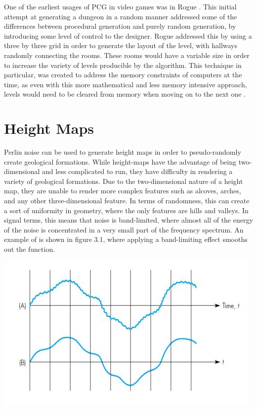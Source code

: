 \documentclass[10pt]{report}
\begin{document}
		One of the earliest usages of PCG in video games was in Rogue \cite{rogue}. This initial attempt at generating a dungeon in a random manner addressed some of the differences between procedural generation and purely random generation, by introducing some level of control to the designer. Rogue addressed this by using a three by three grid in order to generate the layout of the level, with hallways randomly connecting the rooms. These rooms would have a variable size in order to increase the variety of levels producible by the algorithm. This technique in particular, was created to address the memory constraints of computers at the time, as even with this more mathematical and less memory intensive approach, levels would need to be cleared from memory when moving on to the next one \cite{rogue}.
		
	\vspace{10pt}
	\let\clearpage\relax
	\chapter{Height Maps}
	
		Perlin noise can be used to generate height maps in order to pseudo-randomly create geological formations. While height-maps have the advantage of being two-dimensional and less complicated to run, they have difficulty in rendering a variety of geological formations. Due to the two-dimensional nature of a height map, they are unable to render more complex features such as alcoves, arches, and any other three-dimensional feature. In terms of randomness, this can create a sort of uniformity in geometry, where the only features are hills and valleys. In signal terms, this means that noise is band-limited, where almost all of the energy of the noise is concentrated in a very small part of the frequency spectrum. An example of is shown in figure 3.1, where applying a band-limiting effect smooths out the function.
		
		\begin{minipage}{\textwidth}
			\centering
			\includegraphics[scale=.5]{bandlimiting-filter}
			\label{fig:fig5}
		\end{minipage}
		
\end{document}
